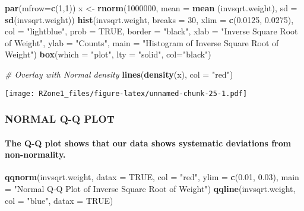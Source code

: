 \documentclass[11pt,]{article}
\newenvironment{Shaded}{\begin{snugshade}}{\end{snugshade}}
\newcommand{\CommentTok}[1]{\textcolor[rgb]{0.56,0.35,0.01}{\textit{#1}}}
\newcommand{\DataTypeTok}[1]{\textcolor[rgb]{0.13,0.29,0.53}{#1}}
\newcommand{\DecValTok}[1]{\textcolor[rgb]{0.00,0.00,0.81}{#1}}
\newcommand{\FloatTok}[1]{\textcolor[rgb]{0.00,0.00,0.81}{#1}}
\newcommand{\KeywordTok}[1]{\textcolor[rgb]{0.13,0.29,0.53}{\textbf{#1}}}
\newcommand{\NormalTok}[1]{#1}
\newcommand{\OtherTok}[1]{\textcolor[rgb]{0.56,0.35,0.01}{#1}}
\newcommand{\StringTok}[1]{\textcolor[rgb]{0.31,0.60,0.02}{#1}}
\let\oldparagraph\paragraph
\renewcommand{\paragraph}[1]{\oldparagraph{#1}\mbox{}}
\begin{document}
\begin{Shaded}
\begin{Highlighting}[]
  \KeywordTok{par}\NormalTok{(}\DataTypeTok{mfrow=}\KeywordTok{c}\NormalTok{(}\DecValTok{1}\NormalTok{,}\DecValTok{1}\NormalTok{))}
\NormalTok{  x <-}\StringTok{ }\KeywordTok{rnorm}\NormalTok{(}\DecValTok{1000000}\NormalTok{, }\DataTypeTok{mean =} \KeywordTok{mean}\NormalTok{ (invsqrt.weight),}
             \DataTypeTok{sd =} \KeywordTok{sd}\NormalTok{(invsqrt.weight))}
  \KeywordTok{hist}\NormalTok{(invsqrt.weight, }\DataTypeTok{breaks =} \DecValTok{30}\NormalTok{, }\DataTypeTok{xlim =} \KeywordTok{c}\NormalTok{(}\FloatTok{0.0125}\NormalTok{, }\FloatTok{0.0275}\NormalTok{),}
       \DataTypeTok{col =} \StringTok{"lightblue"}\NormalTok{, }\DataTypeTok{prob =} \OtherTok{TRUE}\NormalTok{, }\DataTypeTok{border =} \StringTok{"black"}\NormalTok{,}
       \DataTypeTok{xlab =} \StringTok{"Inverse Square Root of Weight"}\NormalTok{,}
       \DataTypeTok{ylab =} \StringTok{"Counts"}\NormalTok{, }\DataTypeTok{main =} \StringTok{"Histogram of  Inverse Square Root of Weight"}\NormalTok{)}
  \KeywordTok{box}\NormalTok{(}\DataTypeTok{which =} \StringTok{"plot"}\NormalTok{, }\DataTypeTok{lty =} \StringTok{"solid"}\NormalTok{, }\DataTypeTok{col=}\StringTok{"black"}\NormalTok{)}
  
  \CommentTok{# Overlay with  Normal density}
  \KeywordTok{lines}\NormalTok{(}\KeywordTok{density}\NormalTok{(x), }\DataTypeTok{col =} \StringTok{"red"}\NormalTok{)}
\end{Highlighting}
\end{Shaded}

\texttt{[image: RZone1\_files/figure-latex/unnamed-chunk-25-1.pdf]}

\hypertarget{normal-q-q-plot}{%
\subsubsection{NORMAL Q-Q PLOT}\label{normal-q-q-plot}}

\hypertarget{the-q-q-plot-shows-that-our-data-shows-systematic-deviations-from-non-normality.}{%
\paragraph{The Q-Q plot shows that our data shows systematic deviations
from
non-normality.}\label{the-q-q-plot-shows-that-our-data-shows-systematic-deviations-from-non-normality.}}

\begin{Shaded}
\begin{Highlighting}[]
  \KeywordTok{qqnorm}\NormalTok{(invsqrt.weight, }\DataTypeTok{datax =} \OtherTok{TRUE}\NormalTok{, }\DataTypeTok{col =} \StringTok{"red"}\NormalTok{, }\DataTypeTok{ylim =} \KeywordTok{c}\NormalTok{(}\FloatTok{0.01}\NormalTok{, }\FloatTok{0.03}\NormalTok{),}
         \DataTypeTok{main =} \StringTok{"Normal Q-Q Plot of Inverse Square Root of Weight"}\NormalTok{)}
  \KeywordTok{qqline}\NormalTok{(invsqrt.weight, }\DataTypeTok{col =} \StringTok{"blue"}\NormalTok{, }\DataTypeTok{datax =} \OtherTok{TRUE}\NormalTok{)}
\end{Highlighting}
\end{Shaded}
\end{document}

